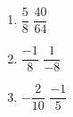 \documentclass[12pt]{article}
\begin{document}
\begin{multicols}{2}
\begin{enumerate}
\item \hspace{0.50in} $\dfrac{5}{8}$ \hspace{0.50in} $\dfrac{40}{64}$ 
  \vspace{0.25in}

\item \hspace{0.50in} $\dfrac{-1}{8}$ \hspace{0.50in} $\dfrac{1}{-8}$ 
  \vspace{0.25in}

\item \hspace{0.50in} $-\dfrac{2}{10}$ \hspace{0.50in} $\dfrac{-1}{5}$ 
  \vspace{0.25in}
\end{enumerate}
\end{multicols}
\end{document}
